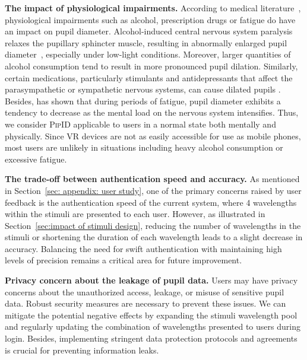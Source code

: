\documentclass[sigconf]{acmart}
\newcommand{\sysname}{\textsc{PipID}\xspace}
\begin{document}
\noindent  \textbf{The impact of physiological impairments.}
According to medical literature~\cite{Kaifie2021, Alcohol_Impact, Alcohol_Impact_2, Koller2020, Drugs_Impact, Drugs_Impact_2, MATSUI2024108219}, physiological impairments such as alcohol, prescription drugs or fatigue do have an impact on pupil diameter. Alcohol-induced central nervous system paralysis relaxes the pupillary sphincter muscle, resulting in abnormally enlarged pupil diameter~\cite{Kaifie2021, Alcohol_Impact, Alcohol_Impact_2}, especially under low-light conditions.
Moreover, larger quantities of alcohol consumption tend to result in more pronounced pupil dilation. Similarly, certain medications, particularly stimulants and antidepressants that affect the parasympathetic or sympathetic nervous systems, can cause dilated pupils \cite{Koller2020, Drugs_Impact, Drugs_Impact_2}. Besides, \cite{MATSUI2024108219} has shown that during periods of fatigue, pupil diameter exhibits a tendency to decrease as the mental load on the nervous system intensifies.
Thus, we consider \sysname applicable to users in a normal state both mentally and physically. Since VR devices are not as easily accessible for use as mobile phones, most users are unlikely in situations including heavy alcohol consumption or excessive fatigue.


 

\noindent   \textbf{The trade-off between authentication speed and accuracy.}
As mentioned in Section~\ref{sec: appendix: user study}, one of the primary concerns raised by user feedback is the authentication speed of the current system, where 4 wavelengths within the stimuli are presented to each user. However, as illustrated in Section~\ref{sec:impact of stimuli design}, reducing the number of wavelengths in the stimuli or shortening the duration of each wavelength leads to a slight decrease in accuracy. Balancing the need for swift authentication with maintaining high levels of precision remains a critical area for future improvement.

\noindent   \textbf{Privacy concern about the leakage of pupil data.}
Users may have privacy concerns about the unauthorized access, leakage, or misuse of sensitive pupil data. Robust security measures are necessary to prevent these issues. We can mitigate the potential negative effects by expanding the stimuli wavelength pool and regularly updating the combination of wavelengths presented to users during login. Besides, implementing stringent data protection protocols and agreements is crucial for preventing information leaks.
\end{document}
